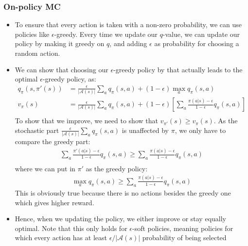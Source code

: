 \subsubsection{On-policy MC}
\begin{itemize}
	\item To ensure that every action is taken with a non-zero probability, we can use policies like $\epsilon$-greedy. Every time we update our $q$-value, we can update our policy by making it greedy on $q$, and adding $\epsilon$ as probability for choosing a random action.
	\item We can show that choosing our $\epsilon$-greedy policy by that actually leads to the optimal $\epsilon$-greedy policy, as:
	\begin{equation*}
		\begin{split}
			q_{\pi}(s,\pi'(s)) & =\frac{\epsilon}{|\mathcal{A}(s)|}\sum_a q_{\pi}(s,a) + \left(1-\epsilon\right)\max_a q_{\pi}(s,a)\\
			v_{\pi}(s) & = \frac{\epsilon}{|\mathcal{A}(s)|} \sum_a q_{\pi}(s,a) + (1-\epsilon)\left[\sum_{a}\frac{\pi(a|s)-\epsilon}{1-\epsilon} q_{\pi}(s,a)\right]\\
		\end{split}
	\end{equation*}
	To show that we improve, we need to show that $v_{\pi'}(s)\geq v_{\pi}(s)$. As the stochastic part $\frac{\epsilon}{|\mathcal{A}(s)|} \sum_a q_{\pi}(s,a)$ is unaffected by $\pi$, we only have to compare the greedy part:
	\begin{equation*}
		\begin{split}
			\sum_{a}\frac{\pi'(a|s)-\epsilon}{1-\epsilon} q_{\pi}(s,a) \geq \sum_{a}\frac{\pi(a|s)-\epsilon}{1-\epsilon} q_{\pi}(s,a)\\
		\end{split}
	\end{equation*}
	where we can put in $\pi'$ as the greedy policy:
	\begin{equation*}
		\begin{split}
			\max_a q_{\pi}(s,a) \geq \sum_{a}\frac{\pi(a|s)-\epsilon}{1-\epsilon} q_{\pi}(s,a)
		\end{split}
	\end{equation*}
	This is obviously true because there is no actions besides the greedy one which gives higher reward. 
	\item Hence, when we updating the policy, we either improve or stay equally optimal. Note that this only holds for $\epsilon$-soft policies, meaning policies for which every action has at least $\epsilon/|\mathcal{A}(s)|$ probability of being selected
\end{itemize}
